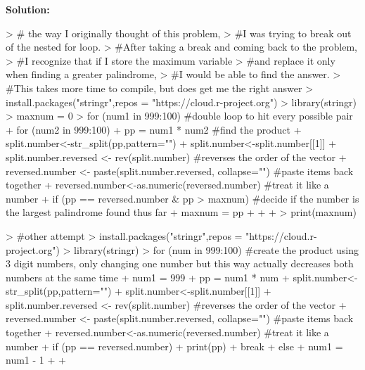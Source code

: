 \documentclass{article}
\begin{document}
\begin{enumerate}
\textbf{Solution:}  
\begin{Schunk}
\begin{Sinput}
> # the way I originally thought of this problem, 
> #I was trying to break out of the nested for loop. 
> #After taking a break and coming back to the problem, 
> #I recognize that if I store the maximum variable 
> #and replace it only when finding a greater palindrome, 
> #I would be able to find the answer. 
> #This takes more time to compile, but does get me the right answer
> install.packages("stringr",repos = "https://cloud.r-project.org")
> library(stringr)
> maxnum = 0
> for (num1 in 999:100){ #double loop to hit every possible pair
+   for (num2 in 999:100){
+     pp = num1 * num2 #find the product
+     split.number<-str_split(pp,pattern="")
+     split.number<-split.number[[1]]
+     split.number.reversed <- rev(split.number) #reverses the order of the vector
+     reversed.number <- paste(split.number.reversed, collapse="")   #paste items back together
+     reversed.number<-as.numeric(reversed.number) #treat it like a number
+     if (pp == reversed.number & pp > maxnum){ #decide if the number  is the largest palindrome found thus far
+       maxnum = pp 
+       }
+   }
+ }
> print(maxnum)
\end{Sinput}
\end{Schunk}

\begin{Schunk}
\begin{Sinput}
> #other attempt
> install.packages("stringr",repos = "https://cloud.r-project.org")
> library(stringr)
> for (num in 999:100){ #create the product using 3 digit numbers, only changing one number but this way actually decreases both numbers at the same time
+   num1 = 999
+   pp = num1 * num 
+   split.number<-str_split(pp,pattern="")
+   split.number<-split.number[[1]]
+   split.number.reversed <- rev(split.number) #reverses the order of the vector
+   reversed.number <- paste(split.number.reversed, collapse="")   #paste items back together
+   reversed.number<-as.numeric(reversed.number) #treat it like a number
+   if (pp == reversed.number){
+     print(pp)
+     break
+   } else {
+     num1 = num1 - 1
+   }
+ }
\end{Sinput}
\end{Schunk}


\end{enumerate}
\end{document}
